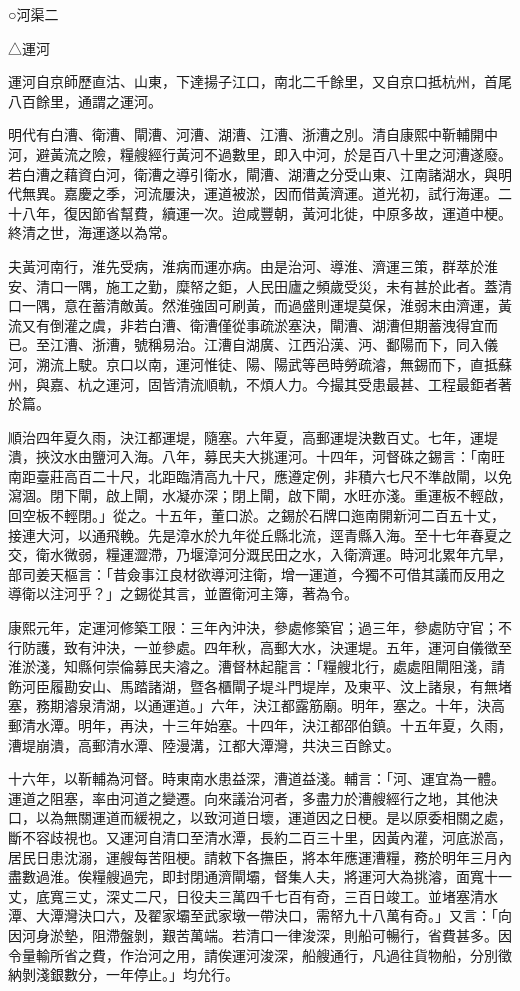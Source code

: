 
\begin{pinyinscope}
○河渠二

△運河

運河自京師歷直沽、山東，下達揚子江口，南北二千餘里，又自京口抵杭州，首尾八百餘里，通謂之運河。

明代有白漕、衛漕、閘漕、河漕、湖漕、江漕、浙漕之別。清自康熙中靳輔開中河，避黃流之險，糧艘經行黃河不過數里，即入中河，於是百八十里之河漕遂廢。若白漕之藉資白河，衛漕之導引衛水，閘漕、湖漕之分受山東、江南諸湖水，與明代無異。嘉慶之季，河流屢決，運道被淤，因而借黃濟運。道光初，試行海運。二十八年，復因節省幫費，續運一次。迨咸豐朝，黃河北徙，中原多故，運道中梗。終清之世，海運遂以為常。

夫黃河南行，淮先受病，淮病而運亦病。由是治河、導淮、濟運三策，群萃於淮安、清口一隅，施工之勤，糜帑之鉅，人民田廬之頻歲受災，未有甚於此者。蓋清口一隅，意在蓄清敵黃。然淮強固可刷黃，而過盛則運堤莫保，淮弱末由濟運，黃流又有倒灌之虞，非若白漕、衛漕僅從事疏淤塞決，閘漕、湖漕但期蓄洩得宜而已。至江漕、浙漕，號稱易治。江漕自湖廣、江西沿漢、沔、鄱陽而下，同入儀河，溯流上駛。京口以南，運河惟徒、陽、陽武等邑時勞疏濬，無錫而下，直抵蘇州，與嘉、杭之運河，固皆清流順軌，不煩人力。今撮其受患最甚、工程最鉅者著於篇。

順治四年夏久雨，決江都運堤，隨塞。六年夏，高郵運堤決數百丈。七年，運堤潰，挾汶水由鹽河入海。八年，募民夫大挑運河。十四年，河督硃之錫言：「南旺南距臺莊高百二十尺，北距臨清高九十尺，應遵定例，非積六七尺不準啟閘，以免瀉涸。閉下閘，啟上閘，水凝亦深；閉上閘，啟下閘，水旺亦淺。重運板不輕啟，回空板不輕閉。」從之。十五年，董口淤。之錫於石牌口迤南開新河二百五十丈，接連大河，以通飛輓。先是漳水於九年從丘縣北流，逕青縣入海。至十七年春夏之交，衛水微弱，糧運澀滯，乃堰漳河分溉民田之水，入衛濟運。時河北累年亢旱，部司姜天樞言：「昔僉事江良材欲導河注衛，增一運道，今獨不可借其議而反用之導衛以注河乎？」之錫從其言，並置衛河主簿，著為令。

康熙元年，定運河修築工限：三年內沖決，參處修築官；過三年，參處防守官；不行防護，致有沖決，一並參處。四年秋，高郵大水，決運堤。五年，運河自儀徵至淮淤淺，知縣何崇倫募民夫濬之。漕督林起龍言：「糧艘北行，處處阻閘阻淺，請飭河臣履勘安山、馬踏諸湖，暨各櫃閘子堤斗門堤岸，及東平、汶上諸泉，有無堵塞，務期濬泉清湖，以通運道。」六年，決江都露筋廟。明年，塞之。十年，決高郵清水潭。明年，再決，十三年始塞。十四年，決江都邵伯鎮。十五年夏，久雨，漕堤崩潰，高郵清水潭、陸漫溝，江都大潭灣，共決三百餘丈。

十六年，以靳輔為河督。時東南水患益深，漕道益淺。輔言：「河、運宜為一體。運道之阻塞，率由河道之變遷。向來議治河者，多盡力於漕艘經行之地，其他決口，以為無關運道而緩視之，以致河道日壞，運道因之日梗。是以原委相關之處，斷不容歧視也。又運河自清口至清水潭，長約二百三十里，因黃內灌，河底淤高，居民日患沈溺，運艘每苦阻梗。請敕下各撫臣，將本年應運漕糧，務於明年三月內盡數過淮。俟糧艘過完，即封閉通濟閘壩，督集人夫，將運河大為挑濬，面寬十一丈，底寬三丈，深丈二尺，日役夫三萬四千七百有奇，三百日竣工。並堵塞清水潭、大潭灣決口六，及翟家壩至武家墩一帶決口，需帑九十八萬有奇。」又言：「向因河身淤墊，阻滯盤剝，艱苦萬端。若清口一律浚深，則船可暢行，省費甚多。因令量輸所省之費，作治河之用，請俟運河浚深，船艘通行，凡過往貨物船，分別徵納剝淺銀數分，一年停止。」均允行。


\end{pinyinscope}
